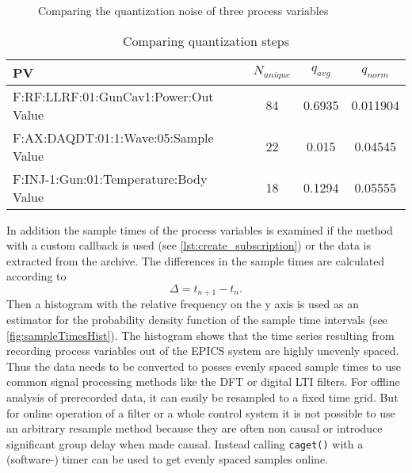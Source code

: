 \begin{figure}[tb]
		\hfill
        
        \hfill
        
        \hfill
       \caption{Comparing the quantization noise of three process variables}
    \label{fig:quantNoise}
\end{figure}

\begin{table}[tb]
\caption{Comparing quantization steps}\label{tab:quantSteps}
\begin{tabular}{lSSS}
\toprule
PV & {$N_{unique}$} & {$q_{avg}$} & {$q_{norm}$}\\
\midrule
F:RF:LLRF:01:GunCav1:Power:Out Value  & 84 & 0.6935 & 0.011904\\
F:AX:DAQDT:01:1:Wave:05:Sample Value  & 22 & 0.015  & 0.04545\\
F:INJ-1:Gun:01:Temperature:Body Value & 18 & 0.1294 & 0.05555\\
\bottomrule
\end{tabular}
\end{table}


In addition the sample times of the process variables is examined if the method with a custom callback is used (see \autoref{lst:create_subscription}) or the data is extracted from the archive. The differences in the sample times are calculated according to
\begin{equation}
\Delta=t_{n+1}-t_n.
\end{equation}
Then a histogram with the relative frequency on the y axis is used as an estimator for the probability density function of the sample time intervals (see \autoref{fig:sampleTimesHist}). The histogram shows that the time series resulting from recording process variables out of the EPICS system are highly unevenly spaced. Thus the data needs to be converted to posses evenly spaced sample times to use common signal processing methods like the DFT or digital LTI filters. For offline analysis of prerecorded data, it can easily be resampled to a fixed time grid. But for online operation of a filter or a whole control system it is not possible to use an arbitrary resample method because they are often non causal or introduce significant group delay when made causal. Instead calling \texttt{caget()} with a (software-) timer can be used to get evenly spaced samples online.

